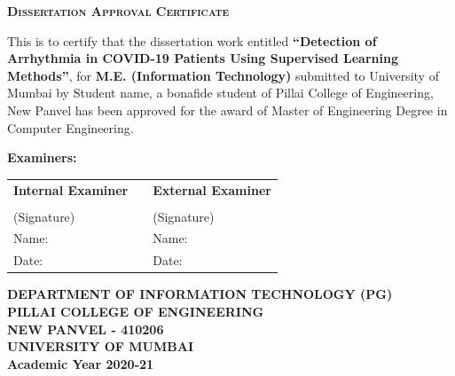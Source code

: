 \thispagestyle{empty}

{\centering
  {\LARGE\bf
    \scshape{Dissertation Approval Certificate}
  }\\
}
\begin{spacing}{1.5}
  \vspace{.5cm}
  {\centering
    {
      This is to certify that the dissertation work entitled \textbf{``Detection of
        Arrhythmia in COVID-19 Patients Using Supervised Learning Methods''}, for \textbf{M.E.
        (Information Technology)} submitted to University of Mumbai by Student name, a bonafide
      student of Pillai College of Engineering, New Panvel has been approved for the award of
      Master of Engineering Degree in Computer Engineering.
    }
  }

  \vspace{1.75cm}
  \noindent
  {\Large\bf
    {Examiners:}
  }

  \begin{table}[H]
    \centering
    \begin{tabularx}{\textwidth}{@{}L{13em}L{9em}L{13em}@{}}
      {\large\bf Internal Examiner} &  & {\large\bf External Examiner} \\
                                    &  &                               \\
      (Signature)                   &  & (Signature)                   \\
      Name:                         &  & Name:                         \\
      Date:                         &  & Date:                         \\
    \end{tabularx}
  \end{table}
\end{spacing}

\vspace{2.5cm}
{\centering\large
\begin{figure}[h!]
  {\par}
\end{figure}
\vspace{0.2cm}

{\bf
  DEPARTMENT OF INFORMATION TECHNOLOGY (PG)\\
  \vspace{0.2cm}
  \bf {PILLAI COLLEGE OF ENGINEERING}\\
  \bf NEW PANVEL - 410206
} \\
{
\hspace{.5cm}
{\bf UNIVERSITY OF MUMBAI} \\
\vspace{0.2cm}
{\bf Academic Year 2020-21}\\
}
}